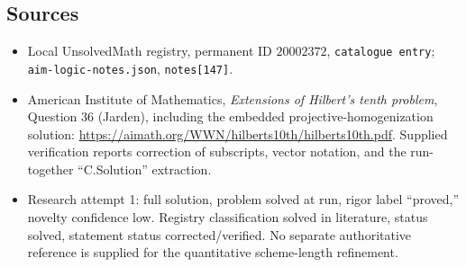 \documentclass[11pt]{article}
\begin{document}
\subsection{Sources}
\begin{itemize}
\item Local UnsolvedMath registry, permanent ID $20002372$, \texttt{catalogue entry}; \texttt{aim-logic-notes.json}, \texttt{notes[147]}.
\item American Institute of Mathematics, \emph{Extensions of Hilbert's tenth problem}, Question 36 (Jarden), including the embedded projective-homogenization solution: \url{https://aimath.org/WWN/hilberts10th/hilberts10th.pdf}. Supplied verification reports correction of subscripts, vector notation, and the run-together ``C.Solution'' extraction.
\item Research attempt 1: full solution, problem solved at run, rigor label ``proved,'' novelty confidence low. Registry classification solved in literature, status solved, statement status corrected/verified. No separate authoritative reference is supplied for the quantitative scheme-length refinement.
\end{itemize}
\end{document}
